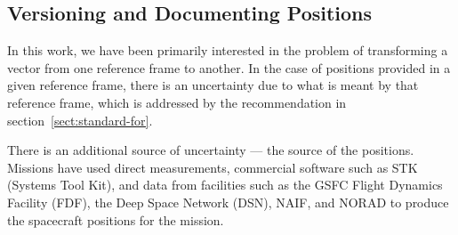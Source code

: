 \documentclass[draft]{agujournal2019}
\begin{document}








\subsection{Versioning and Documenting Positions}
\label{sect:ephemeris-version}

In this work, we have been primarily interested in the problem of transforming a vector from one reference frame to another. In the case of positions provided in a given reference frame, there is an uncertainty due to what is meant by that reference frame, which is addressed by the recommendation in section~\ref{sect:standard-for}. 

There is an additional source of uncertainty --- the source of the positions. Missions have used direct  measurements, commercial software such as STK (Systems Tool Kit), and data from facilities such as the GSFC Flight Dynamics Facility (FDF), the Deep Space Network (DSN), NAIF, and NORAD to produce the spacecraft positions for the mission. 
\end{document}
